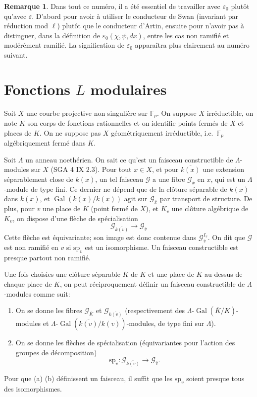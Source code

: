\documentclass[11pt,a4paper]{amsart}
\theoremstyle{plain}
\theoremstyle{definition}
\newtheorem{remark}[theorem]{Remarque}
\DeclareMathOperator{\Gal}{Gal}
\newcommand{\dbF}{\mathbb{F}}
\newenvironment{para}{\par\noindent}{\par}
\newcommand{\ov}[1]{\overline{#1}}
\newcommand{\eps}{\varepsilon}
\begin{document}
\begin{remark}
Dans tout ce num\'ero, il a \'et\'e essentiel de travailler avec $\eps_{0}$ plut\^ot qu'avec $\eps$. D'abord pour avoir \`a utiliser le conducteur de Swan (invariant par r\'eduction mod $\ell$) plut\^ot que le conducteur d'Artin, ensuite pour n'avoir pas \`a distinguer, dans la d\'efinition de $\eps_{0}(\chi,\psi,dx)$, entre les cas non ramifi\'e et mod\'er\'ement ramifi\'e. La signification de $\eps_{0}$ appara\^itra plus clairement au num\'ero suivant.
\end{remark}


\section{Fonctions $L$ modulaires}

\begin{para}
Soit $X$ une courbe projective non singuli\`ere sur $\dbF_{p}$. On suppose $X$ irr\'eductible, on note $K$ son corps de fonctions rationnelles et on identifie points ferm\'es de $X$ et places de $K$. On ne suppose pas $X$ g\'eom\'etriquement irr\'eductible, i.e.~$\dbF_{p}$ alg\'ebriquement ferm\'e dans $K$.
\end{para}

\begin{para}
Soit $\Lambda$ un anneau noeth\'erien. On sait ce qu'est un faisceau constructible de $\Lambda$-modules sur $X$ (SGA 4 IX 2.3). Pour tout $x \in X$, et pour $\ov{k(x)}$ une extension s\'eparablement close de $k(x)$, un tel faisceau $\mathscr{G}$ a une fibre $\mathscr{G}_{\ov{x}}$ en $x$, qui est un $\Lambda$-module de type fini. Ce dernier ne d\'epend que de la cl\^oture s\'eparable de $k(x)$ dans $\ov{k(x)}$, et $\Gal(k(x)/k(x))$ agit sur $\mathscr{G}_{\ov{x}}$ par transport de structure. De plus, pour $v$ une place de $K$ (point ferm\'e de $X$), et $\ov{K}_{v}$ une cl\^oture alg\'ebrique de $K_{v}$, on dispose d'une fl\`eche de sp\'ecialisation
\[
\mathscr{G}_{\ov{k(v)}} \longrightarrow \mathscr{G}_{\ov{v}}
\]
Cette fl\`eche est \'equivariante; son image est donc contenue dans $\mathscr{G}_{\ov{v}}^{I_{v}}$. On dit que $\mathscr{G}$ est non ramifi\'e en $v$ si $\text{sp}_{v}$ est un isomorphisme. Un faisceau constructible est presque partout non ramifi\'e.
\end{para}

Une fois choisies une cl\^oture s\'eparable $\ov{K}$ de $K$ et une place de $\ov{K}$ au-dessus de chaque place de $K$, on peut r\'eciproquement d\'efinir un faisceau constructible de $\Lambda$-modules comme suit:
\begin{enumerate}
\item[(a)] On se donne les fibres $\mathscr{G}_{\ov{K}}$ et $\mathscr{G}_{\ov{k(v)}}$ (respectivement des $\Lambda$-$\Gal(\ov{K}/K)$-modules et $\Lambda$-$\Gal(\ov{k(v)}/k(v))$-modules, de type fini sur $\Lambda$).
\item[(b)] On se donne les fl\`eches de sp\'ecialisation (\'equivariantes pour l'action des groupes de d\'ecomposition)
\[
\text{sp}_{v}: \mathscr{G}_{\ov{k(v)}} \longrightarrow \mathscr{G}_{\ov{v}}.
\]
\end{enumerate}
Pour que (a) (b) d\'efinissent un faisceau, il suffit que les $\text{sp}_{v}$ soient presque tous des isomorphismes.
\end{document}
